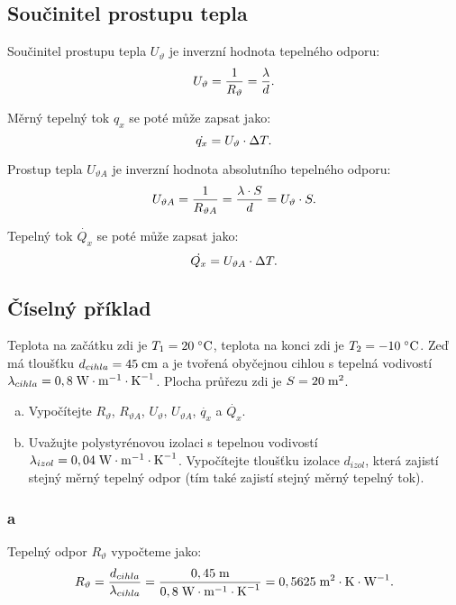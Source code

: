 \documentclass{article}
\begin{document}
\subsection{Součinitel prostupu tepla}
Součinitel prostupu tepla $U_\vartheta$ je inverzní hodnota tepelného odporu:
\begin{equation}
    U_\vartheta = \frac{1}{R_{\vartheta}} = \frac{\lambda}{d}.
    \unit{(\ueqWandMinvsqKinv)}
\end{equation}

Měrný tepelný tok $q_x$ se poté může zapsat jako:
\begin{equation}
    \dot{q_x} = U_\vartheta \cdot \Delta T.
    \unit{(\ueqWandMinvsq)}
\end{equation}

Prostup tepla $U_{\vartheta A}$ je inverzní hodnota absolutního tepelného odporu:
\begin{equation}
    U_{\vartheta A} = \frac{1}{R_{\vartheta A}} = \frac{\lambda \cdot S}{d} = U_\vartheta \cdot S.
    \unit{(\ueqWandKinv)}
\end{equation}

Tepelný tok $\dot{Q_x}$ se poté může zapsat jako:
\begin{equation}
    \dot{Q_x} = U_{\vartheta A} \cdot \Delta T.
    \unit{(\ueqW)}
\end{equation}


\subsection{Číselný příklad}
Teplota na začátku zdi je $T_1 = 20 \; ^\circ \textrm{C}$, teplota na konci zdi je $T_2 = -10 \; ^\circ \textrm{C}$. Zeď má tloušťku $d_{cihla} = 45 \; \textrm{cm}$ a je tvořená obyčejnou cihlou s tepelná vodivostí $\lambda_{cihla} = 0,8 \; \textrm{W} \cdot \textrm{m}^{-1} \cdot \textrm{K}^{-1}$. Plocha průřezu zdi je $S = 20 \; \textrm{m}^{\textrm{2}}$.

\begin{enumerate}[a)]
    \item Vypočítejte $R_{\vartheta}$, $R_{\vartheta A}$, $U_\vartheta$, $U_{\vartheta A}$, $\dot{q_x}$ a $\dot{Q_x}$.
    \item Uvažujte polystyrénovou izolaci s tepelnou vodivostí $\lambda_{izol} = 0,04 \; \textrm{W} \cdot \textrm{m}^{-1} \cdot \textrm{K}^{-1}$. Vypočítejte tloušťku izolace $d_{izol}$, která zajistí stejný měrný tepelný odpor (tím také zajistí stejný měrný tepelný tok).
\end{enumerate}

\subsubsection{a}
Tepelný odpor $R_{\vartheta}$ vypočteme jako:
$$
    R_{\vartheta} = \frac{d_{cihla}}{\lambda_{cihla}} = \frac{0,45 \; \textrm{m}}{0,8 \; \textrm{W} \cdot \textrm{m}^{-1} \cdot \textrm{K}^{-1}} = 0,5625 \; \textrm{m}^{\textrm{2}} \cdot \textrm{K} \cdot \textrm{W}^{-1}.
$$
\end{document}
